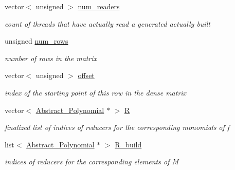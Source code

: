 \begin{DoxyCompactItemize}
vector$<$ unsigned $>$ \hyperlink{group___g_b_computation_ac160863a9b65b41bb6069740ca883da8}{num\+\_\+readers}
\begin{DoxyCompactList}\small\item\em count of threads that have actually read a generated actually built \end{DoxyCompactList}\item 
\mbox{\label{group___g_b_computation_a4c95ce9de848b6a4312ae19fef8980b3}} 
unsigned \hyperlink{group___g_b_computation_a4c95ce9de848b6a4312ae19fef8980b3}{num\+\_\+rows}
\begin{DoxyCompactList}\small\item\em number of rows in the matrix \end{DoxyCompactList}\item 
\mbox{\label{group___g_b_computation_a5686aed4d209fd6e2596b19e060d3c29}} 
vector$<$ unsigned $>$ \hyperlink{group___g_b_computation_a5686aed4d209fd6e2596b19e060d3c29}{offset}
\begin{DoxyCompactList}\small\item\em index of the starting point of this row in the dense matrix \end{DoxyCompactList}\item 
\mbox{\label{group___g_b_computation_a90488d65365fd6a5512ccda45780acc5}} 
vector$<$ \hyperlink{group__polygroup_class_abstract___polynomial}{Abstract\+\_\+\+Polynomial} $\ast$ $>$ \hyperlink{group___g_b_computation_a90488d65365fd6a5512ccda45780acc5}{R}
\begin{DoxyCompactList}\small\item\em finalized list of indices of reducers for the corresponding monomials of {\ttfamily f} \end{DoxyCompactList}\item 
\mbox{\label{group___g_b_computation_a03bda496da1d09c73151ba42b6db7bc4}} 
list$<$ \hyperlink{group__polygroup_class_abstract___polynomial}{Abstract\+\_\+\+Polynomial} $\ast$ $>$ \hyperlink{group___g_b_computation_a03bda496da1d09c73151ba42b6db7bc4}{R\+\_\+build}
\begin{DoxyCompactList}\small\item\em indices of reducers for the corresponding elements of {\ttfamily M} \end{DoxyCompactList}\item 

\end{DoxyCompactItemize}
